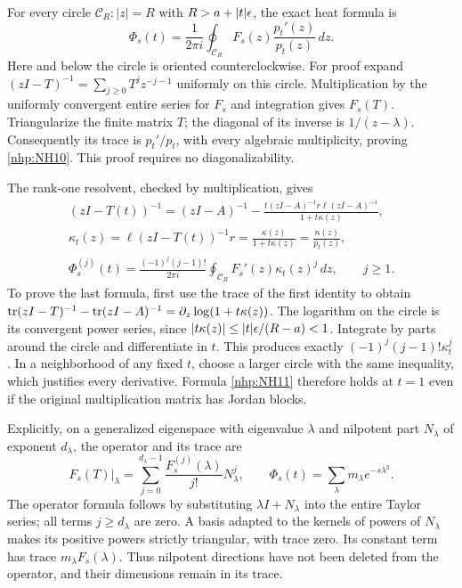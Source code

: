 \documentclass[11pt]{article}
\begin{document}
For every circle \(\mathcal C_R:|z|=R\) with
\(R>a+|t|\epsilon\), the exact heat formula is
\begin{equation}\tag{NH10}\label{nhp:NH10}
\Phi_s(t)=\frac1{2\pi i}\oint_{\mathcal C_R}
F_s(z)\frac{p_t'(z)}{p_t(z)}\,dz .
\end{equation}
Here and below the circle is oriented counterclockwise.
For proof expand \((zI-T)^{-1}=\sum_{j\ge0}T^jz^{-j-1}\)
uniformly on this circle. Multiplication by the uniformly
convergent entire series for \(F_s\) and integration gives
\(F_s(T)\). Triangularize the finite matrix \(T\);
the diagonal of its inverse is \(1/(z-\lambda)\).
Consequently its trace is \(p_t'/p_t\), with every
algebraic multiplicity, proving \eqref{nhp:NH10}.
This proof requires no diagonalizability.

The rank-one resolvent, checked by multiplication, gives
\begin{equation}\tag{NH11}\label{nhp:NH11}
\begin{gathered}
(zI-T(t))^{-1}
=(zI-A)^{-1}
-\frac{t(zI-A)^{-1}r\ell(zI-A)^{-1}}{1+t\kappa(z)},\\
\kappa_t(z)=\ell(zI-T(t))^{-1}r
=\frac{\kappa(z)}{1+t\kappa(z)}=\frac{n(z)}{p_t(z)},\\
\Phi_s^{(j)}(t)
=\frac{(-1)^j(j-1)!}{2\pi i}
\oint_{\mathcal C_R}F_s'(z)\kappa_t(z)^j\,dz,\qquad j\ge1.
\end{gathered}
\end{equation}
To prove the last formula, first use the trace of the
first identity to obtain
\(\operatorname{tr}(zI-T)^{-1}-\operatorname{tr}(zI-A)^{-1}
=\partial_z\log(1+t\kappa(z))\).
The logarithm on the circle is its convergent power series,
since \(|t\kappa(z)|\le|t|\epsilon/(R-a)<1\).
Integrate by parts around the circle and differentiate
in \(t\). This produces exactly
\((-1)^j(j-1)!\kappa_t^j\).
In a neighborhood of any fixed \(t\), choose a larger
circle with the same inequality, which justifies every
derivative. Formula \eqref{nhp:NH11} therefore holds at \(t=1\)
even if the original multiplication matrix has Jordan blocks.

Explicitly, on a generalized eigenspace with eigenvalue
\(\lambda\) and nilpotent part \(N_\lambda\) of exponent
\(d_\lambda\), the operator and its trace are
\begin{equation}\tag{NH12}\label{nhp:NH12}
F_s(T)|_\lambda
=\sum_{j=0}^{d_\lambda-1}
\frac{F_s^{(j)}(\lambda)}{j!}N_\lambda^j,\qquad
\Phi_s(t)=\sum_\lambda m_\lambda e^{-s\lambda^2}.
\end{equation}
The operator formula follows by substituting
\(\lambda I+N_\lambda\) into the entire Taylor series;
all terms \(j\ge d_\lambda\) are zero.
A basis adapted to the kernels of powers of \(N_\lambda\)
makes its positive powers strictly triangular, with trace
zero. Its constant term has trace \(m_\lambda F_s(\lambda)\).
Thus nilpotent directions have not been deleted from the
operator, and their dimensions remain in its trace.
\end{document}
